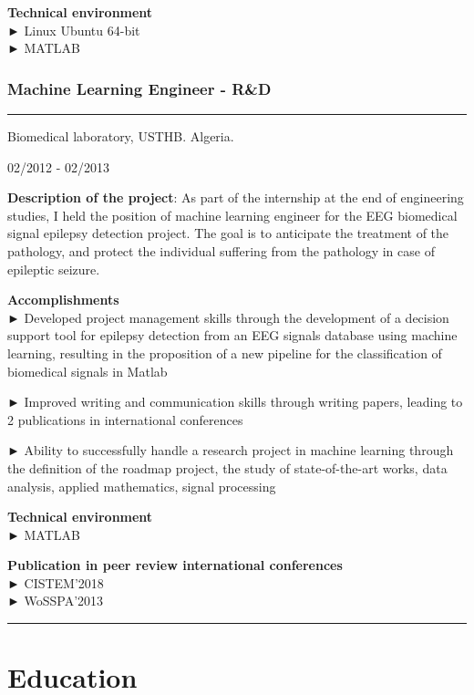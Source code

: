 \documentclass[
]{article}
\begin{document}
\textbf{Technical environment}\\
► Linux Ubuntu 64-bit\\
► MATLAB

\hypertarget{machine-learning-engineer---rd}{%
\subsubsection{Machine Learning Engineer -
R\&D}\label{machine-learning-engineer---rd}}

\begin{center}\rule{0.5\linewidth}{\linethickness}\end{center}

Biomedical laboratory, USTHB. Algeria.

02/2012 - 02/2013

\textbf{Description of the project}: As part of the internship at the
end of engineering studies, I held the position of machine learning
engineer for the EEG biomedical signal epilepsy detection project. The
goal is to anticipate the treatment of the pathology, and protect the
individual suffering from the pathology in case of epileptic seizure.

\textbf{Accomplishments}\\
► Developed project management skills through the development of a
decision support tool for epilepsy detection from an EEG signals
database using machine learning, resulting in the proposition of a new
pipeline for the classification of biomedical signals in Matlab

► Improved writing and communication skills through writing papers,
leading to 2 publications in international conferences

► Ability to successfully handle a research project in machine learning
through the definition of the roadmap project, the study of
state-of-the-art works, data analysis, applied mathematics, signal
processing

\textbf{Technical environment}\\
► MATLAB

\textbf{Publication in peer review international conferences}\\
► CISTEM'2018\\
► WoSSPA'2013

\begin{center}\rule{0.5\linewidth}{\linethickness}\end{center}

\hypertarget{education}{%
\section{Education}\label{education}}
\end{document}
